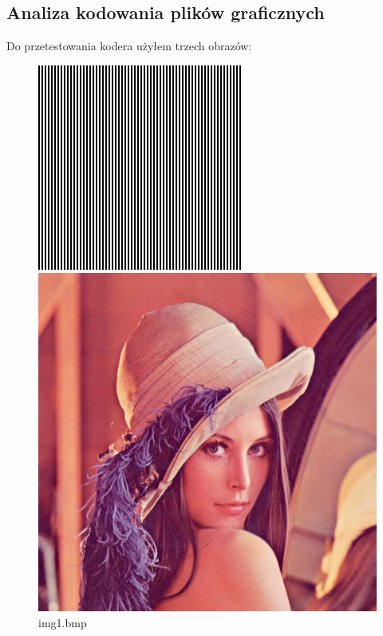 \documentclass[12pt]{article}
\begin{document}
\subsection{Analiza kodowania plików graficznych}
Do przetestowania kodera użyłem trzech obrazów:
\begin{figure}[!htb]
    \includegraphics[width=\linewidth]{paski}
    \caption{img1.bmp}
  \endminipage\hfill
    \includegraphics[width=\linewidth]{lena}

\end{figure}
\end{document}
